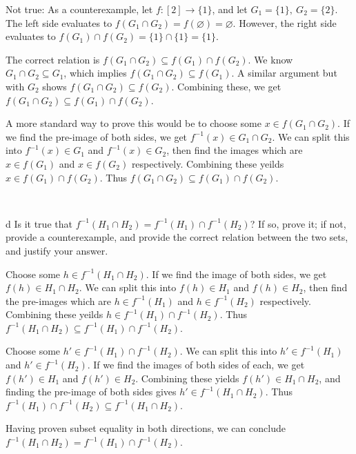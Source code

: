 \documentclass{article}
\begin{document}
Not true: As a counterexample, let $f:[ 2]\rightarrow \{1\}$, and let $G_{1} =\{1\} ,\ G_{2} =\{2\}$. The left side evaluates to $f(G_{1} \cap G_{2} )=f( \varnothing) =\varnothing$. However, the right side evaluates to $f(G_{1} )\cap f(G_{2} )=\{1\} \cap \{1\} =\{1\}$.

The correct relation is $f(G_{1} \cap G_{2} )\subseteq f(G_{1} )\cap f(G_{2} )$. We know $G_{1} \cap G_{2} \subseteq G_{1}$, which implies $f( G_{1} \cap G_{2}) \subseteq f( G_{1})$. A similar argument but with $G_{2}$ shows $f( G_{1} \cap G_{2}) \subseteq f( G_{2})$. Combining these, we get $f(G_{1} \cap G_{2} )\subseteq f(G_{1} )\cap f(G_{2} )$.

A more standard way to prove this would be to choose some $x\in f (G_{1} \cap G_{2} )$. If we find the pre-image of both sides, we get $f^{-1}( x) \in G_{1} \cap G_{2}$. We can split this into $f^{-1}( x) \in G_{1}$ and $f^{-1}( x) \in G_{2}$, then find the images which are $x\in f( G_{1})$ and $x\in f( G_{2})$ respectively. Combining these yeilds $x\in f(G_{1} )\cap f(G_{2} )$. Thus $f(G_{1} \cap G_{2} )\subseteq f(G_{1} )\cap f (G_{2} )$.

\

\begin{problem} d
Is it true that $f^{-1}(H_1\cap H_2)=f^{-1}(H_1)\cap f^{-1}(H_2)$? If so, prove it; if not, provide a counterexample, and provide the correct relation between the two sets, and justify your answer.
\end{problem}

Choose some $h\in f^{-1} (H_{1} \cap H_{2} )$. If we find the image of both sides, we get $f( h) \in H_{1} \cap H_{2}$. We can split this into $f( h) \in H_{1}$ and $f( h) \in H_{2}$, then find the pre-images which are $h\in f^{-1}( H_{1})$ and $h\in f^{-1}( H_{2})$ respectively. Combining these yeilds $h\in f^{-1} (H_{1} )\cap f^{-1} (H_{2} )$. Thus $f^{-1} (H_{1} \cap H_{2} )\subseteq f^{-1} (H_{1} )\cap f^{-1} (H_{2} )$.



Choose some $h'\in f^{-1} (H_{1} )\cap f^{-1} (H_{2} )$. We can split this into $h'\in f^{-1}( H_{1})$ and $h'\in f^{-1}( H_{2})$. If we find the images of both sides of each, we get $f( h') \in H_{1}$ and $f( h') \in H_{2}$. Combining these yields $f( h') \in H_{1} \cap H_{2}$, and finding the pre-image of both sides gives $h'\in f^{-1}( H_{1} \cap H_{2})$. Thus $f^{-1} (H_{1} )\cap f^{-1} (H_{2} )\subseteq f^{-1}( H_{1} \cap H_{2})$.



Having proven subset equality in both directions, we can conclude $f^{-1} (H_{1} \cap H_{2} )=f^{-1} (H_{1} )\cap f^{-1} (H_{2} )$. 

\
\hline
\end{document}
